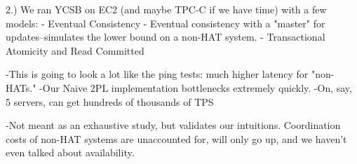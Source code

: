 2.) We ran YCSB on EC2 (and maybe TPC-C if we have time) with a few models:
	- Eventual Consistency
	- Eventual consistency with a "master" for updates--simulates the lower bound on a non-HAT system.
	- Transactional Atomicity and Read Committed
	
	-This is going to look a lot like the ping tests: much higher latency for "non-HATs."
	-Our Naive 2PL implementation bottlenecks extremely quickly.
	-On, say, 5 servers, can get hundreds of thousands of TPS

	-Not meant as an exhaustive study, but validates our intuitions. Coordination costs of non-HAT systems are unaccounted for, will only go up, and we haven't even talked about availability.
